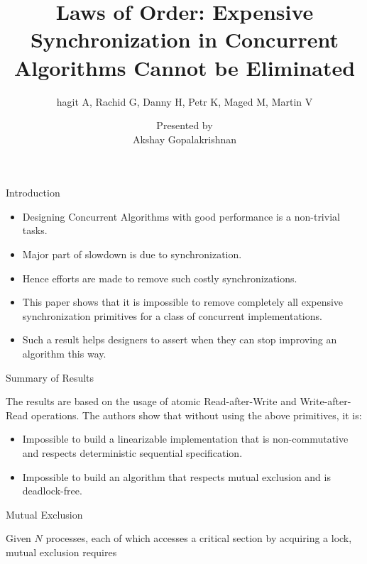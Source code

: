 \documentclass[notes, xcolor=dvipsnames]{beamer}
\title{Laws of Order: Expensive Synchronization in Concurrent Algorithms Cannot be Eliminated}
\subtitle{hagit A, Rachid G, Danny H, Petr K, Maged M, Martin V}
\author{Presented by \\ Akshay Gopalakrishnan}
\begin{document}
    
    \begin{frame}

        \maketitle

    \end{frame}


    \begin{frame}{Introduction}
        \begin{itemize}
            \item Designing Concurrent Algorithms with good performance is a non-trivial tasks.
            \item Major part of slowdown is due to synchronization.
            \item Hence efforts are made to remove such costly synchronizations.
            \item This paper shows that it is impossible to remove completely all expensive synchronization primitives for a class of concurrent implementations.
            \item Such a result helps designers to assert when they can stop improving an algorithm this way.
        \end{itemize}
    \end{frame}

    \begin{frame}{Summary of Results}

        The results are based on the usage of atomic Read-after-Write and Write-after-Read operations. 
        The authors show that without using the above primitives, it is: 
        \begin{itemize}
            \item Impossible to build a linearizable implementation that is non-commutative and respects deterministic sequential specification. 
            \item Impossible to build an algorithm that respects mutual exclusion and is deadlock-free. 
        \end{itemize}
        
    \end{frame}

    \begin{frame}{Mutual Exclusion}
        
        Given $N$ processes, each of which accesses a critical section by acquiring a lock, mutual exclusion requires 

    \end{frame}
\end{document}
